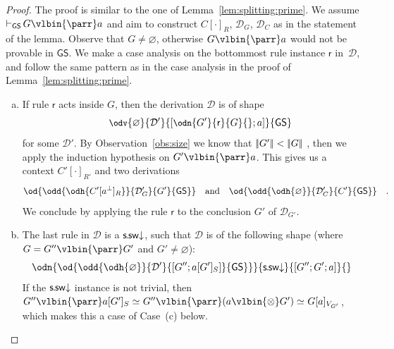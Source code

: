 \documentclass{lmcs} %
\newcommand{\isom}[1][]{\simeq_{#1}}
\newcommand{\proves}[2][]{\mathord{\vdash_{#1}\,}{#2}}
\renewcommand{\emptyset}{\varnothing}
\def\unit{\emptyset}
\def\GS{\mathsf{GS}}
\newcommand{\coons}[2]{[#1]_{#2}}														%
\newcommand{\coonso}[1]{[\cdot]_{#1}}
\newcommand{\quand}{\quad\mbox{and}\quad}
\newcommand{\quadfs}{\rlap{\quad.}}
\def\ssdr{\dssrule}
\def\rr{\mathsf{r}}
\def\ods#1#2#3#4{\od{\odd{\odh{#1}}{#2}{#3}{#4}}}
\def\cneg#1{{#1^\bot}}
\def\lpar{\vlbin{\parr}}
\def\ltens{\vlbin{\otimes}}
\def\ssrule{\mathsf{s\mkern-1mu.\mkern-1mu sw}}
\def\dssrule{\ssrule\mathord{\downarrow}}
\def\gC{C}
\def\gG{G}
\newcommand{\dD}{\mathcal{D}}
\def\gsize#1{|\mkern-2.75mu|#1|\mkern-2.75mu|}
\newcommand{\gless}[2]{\gsize{#1} < \gsize{#2}}
\theoremstyle{plain}
\begin{document}
\lemAtomSplit*
\begin{proof}%
	The proof is similar to the one of Lemma~\ref{lem:splitting:prime}.
	We assume  $\proves[\GS]{G\lpar a}$
	and aim to construct 
	$\gC\coonso{R}$, $\dD_G$, $\dD_C$
	as in the statement of the lemma. 
	Observe that $\gG\neq\unit$, otherwise $\gG\lpar a$ would not
	be provable in $\GS$. 
	We make a case analysis on the bottommost rule instance $\rr$ in~$\dD$, and follow the same pattern as in the case analysis in the proof of Lemma~\ref{lem:splitting:prime}. 
	\begin{enumerate}[(a)]          
		
		
		\item 
		\label{proof:atomCase:inside}
		
		If rule $\rr$ acts inside $\gG$, then the derivation $\dD$ is of shape 
		\begin{equation*}
			\small
			\odv{\unit}
			{\dD'}{[\odn{\gG'}{\rr}{\gG}{};a]}{\GS}
			\hskip-2em
		\end{equation*}
		for some $\dD'$. 
		By Observation~\ref{obs:size} we know that  $\gless{\gG'}{\gG}$ ,
		then we apply the induction hypothesis on $\gG'\lpar a$.
		This gives us a context $\gC'\coonso {R'}$ and two derivations
		\begin{equation*}
			\ods{\gC'\coons{\cneg a}R}{\dD_{G}'}{\gG'}{\GS}
			\quand
			\ods{\unit}{\dD_{\gC}'}{\gC' }{\GS}
			\quadfs
		\end{equation*}
		We conclude by applying the rule 
		$\rr$ to the conclusion $\gG'$ of $\dD_{G'}$.
		
		
	      \item The last rule in $\dD$ is a $\ssdr$, such that $\dD$ is of the following shape (where $\gG=\gG''\lpar\gG'$ and $\gG'\neq\unit$):
		\begin{equation*}
			\odn{\ods{\unit}{
					\dD'}{[\gG'';a\coons{\gG'}S]}{\GS}}{
				\ssdr}{[\gG'';\gG';a]}{}
		\end{equation*}
		If the $\ssdr$ instance is not trivial, then $\gG''\lpar a\coons{\gG'}S\isom \gG''\lpar(a\ltens \gG')\isom\gG\coons{a}{V_{\gG'}}$, which makes this a case of Case~(c) below.
		

\end{enumerate}
\end{proof}
\end{document}
